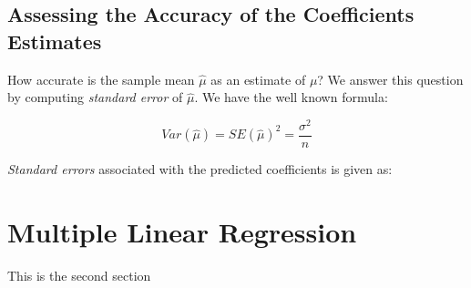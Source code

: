 \documentclass{article}
\begin{document}
	\subsection{Assessing the Accuracy of the Coefficients Estimates}
	How accurate is the sample mean $\hat{\mu}$ as an estimate of $\mu$? We answer this question by computing \textit{standard error} of $\hat{\mu}$. We have the well known formula:
	
	\begin{equation}
		Var(\hat{\mu}) = SE(\hat{\mu})^2 = \frac{\sigma^2}{n}
	\end{equation}

	\textit{Standard errors} associated with the predicted coefficients is given as:
	
	
	\section{Multiple Linear Regression}
	This is the second section
\end{document}
